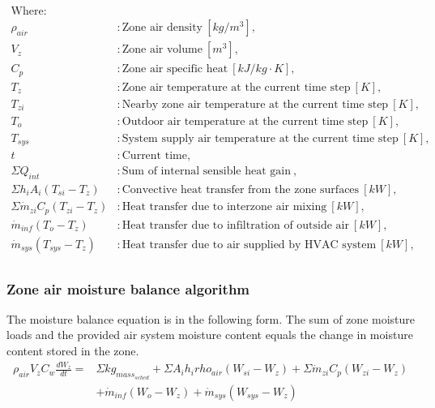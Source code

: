 \begin{align*}
\text{Where: }\\
  \rho_{air} &: \text{Zone air density} ~ [kg/m^{3}], \\
  V_{z} &: \text{Zone air volume} ~ [m^{3}],\\
  C_{p} &: \text{Zone air specific heat} ~ [kJ/kg \cdot K],\\
  T_{z} &: \text{Zone air temperature at the current time step} ~[K],\\
  T_{zi} &: \text{Nearby zone air temperature at the current time step} ~[K],\\
  T_{o} &: \text{Outdoor air temperature at the current time step} ~[K],\\
  T_{sys} &: \text{System supply air temperature at the current time step} ~[K],\\
  t &: \text{Current time},\\
  \Sigma{Q_{int}} &: \text{Sum of internal sensible heat gain} ~ ,\\
  \Sigma{h_i A_i (T_{si}-T_z)} &: \text{Convective heat transfer from the zone surfaces} ~ [kW],\\
  \Sigma{\dot{m}_{zi}C_p(T_{zi}-T_z)} &: \text{Heat transfer due to interzone air mixing} ~ [kW],\\
  \dot{m}_{inf} (T_o - T_z)&: \text{Heat transfer due to infiltration of outside air} ~ [kW],\\
  \dot{m}_{sys} (T_{sys} - T_z)&: \text{Heat transfer due to air supplied by HVAC system} ~ [kW],\\
\end{align*}


\subsubsection{Zone air moisture balance algorithm}\label{Zone-air-moisture-balance-algorithm}
The moisture balance equation is in the following form. The sum of zone moisture loads and the provided air system moisture content equals the change in moisture content stored in the zone. 
\begin{equation}
\begin{aligned}
\rho_{air} V_{z} C_{w}\frac {dW_z} {dt} = &\Sigma{kg_{mass_{sched}}} + \Sigma{A_i h_i rho_{air} (W_{si} - W_z)} + \Sigma{\dot{m}_{zi} C_p (W_{zi}-W_z)} \\
& + \dot{m}_{inf} (W_o - W_z) + \dot{m}_{sys} (W_{sys} - W_z)
\end{aligned}
\end{equation}

